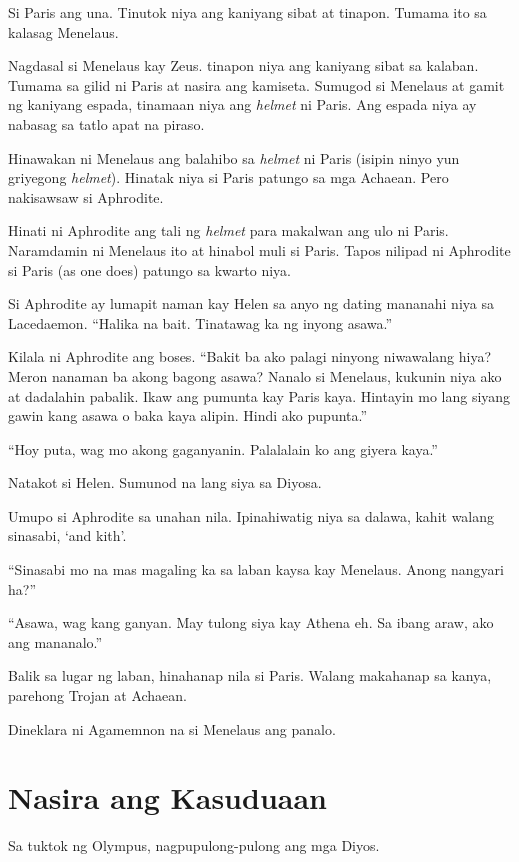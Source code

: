 \documentclass[12pt,letterpaper]{report}
\begin{document}
Si Paris ang una. Tinutok niya ang kaniyang sibat at tinapon. Tumama ito sa kalasag Menelaus.

Nagdasal si Menelaus kay Zeus. tinapon niya ang kaniyang sibat sa kalaban. Tumama sa gilid ni Paris at nasira ang kamiseta. Sumugod si Menelaus at gamit ng kaniyang espada, tinamaan niya ang \textit{helmet} ni Paris. Ang espada niya ay nabasag sa tatlo apat na piraso.

Hinawakan ni Menelaus ang balahibo sa \textit{helmet} ni Paris (isipin ninyo yun griyegong \textit{helmet}). Hinatak niya si Paris patungo sa mga Achaean. Pero nakisawsaw si Aphrodite.

Hinati ni Aphrodite ang tali ng \textit{helmet} para makalwan ang ulo ni Paris. Naramdamin ni Menelaus ito at hinabol muli si Paris. Tapos nilipad ni Aphrodite si Paris (as one does) patungo sa kwarto niya.

Si Aphrodite ay lumapit naman kay Helen sa anyo ng dating mananahi niya sa Lacedaemon. ``Halika na bait. Tinatawag ka ng inyong asawa.''

Kilala ni Aphrodite ang boses. ``Bakit ba ako palagi ninyong niwawalang hiya? Meron nanaman ba akong bagong asawa? Nanalo si Menelaus, kukunin niya ako at dadalahin pabalik. Ikaw ang pumunta kay Paris kaya. Hintayin mo lang siyang gawin kang asawa o baka kaya alipin. Hindi ako pupunta.''

``Hoy puta, wag mo akong gaganyanin. Palalalain ko ang giyera kaya.''

Natakot si Helen. Sumunod na lang siya sa Diyosa.

Umupo si Aphrodite sa unahan nila. Ipinahiwatig niya sa dalawa, kahit walang sinasabi, `and kith'.

``Sinasabi mo na mas magaling ka sa laban kaysa kay Menelaus. Anong nangyari ha?''

``Asawa, wag kang ganyan. May tulong siya kay Athena eh. Sa ibang araw, ako ang mananalo.''

Balik sa lugar ng laban, hinahanap nila si Paris. Walang makahanap sa kanya, parehong Trojan at Achaean.

Dineklara ni Agamemnon na si Menelaus ang panalo.


\pagebreak
\chapter{Nasira ang Kasuduaan}

Sa tuktok ng Olympus, nagpupulong-pulong ang mga Diyos.
\end{document}
